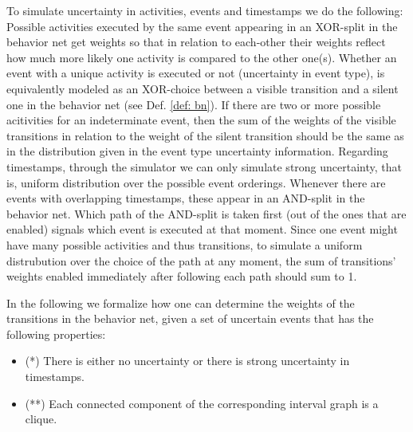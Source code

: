 To simulate uncertainty in activities, events and timestamps we do the following: 
Possible activities executed by the same event appearing in an XOR-split in the behavior net get weights so that in relation to each-other their weights reflect how much more likely one activity is compared to the other one(s). 
Whether an event with a unique activity is executed or not (uncertainty in event type), is equivalently modeled as an XOR-choice between a visible transition and a silent one in the behavior net (see Def. \ref{def: bn}). 
If there are two or more possible acitivities for an indeterminate event, then the sum of the weights of the visible transitions in relation to the weight of the silent transition should be the same as in the distribution given in the event type uncertainty information.
Regarding timestamps, through the simulator we can only simulate strong uncertainty, that is, uniform distribution over the possible event orderings. 
Whenever there are events with overlapping timestamps, these appear in an AND-split in the behavior net. 
Which path of the AND-split is taken first (out of the ones that are enabled) signals which event is executed at that moment.
Since one event might have many possible activities and thus transitions, to simulate a uniform distrubution over the choice of the path at any moment, the sum of transitions' weights enabled immediately after following each path should sum to 1.

In the following we formalize how one can determine the weights of the transitions in the behavior net, given a set of uncertain events that has the following properties:
\begin{itemize}
\item (*) There is either no uncertainty or there is strong uncertainty in timestamps.
\item (**) Each connected component of the corresponding interval graph is a clique.
\end{itemize}

